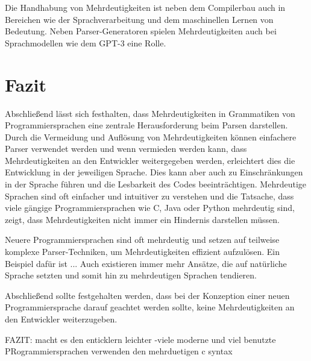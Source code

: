 \documentclass[runningheads]{llncs}
\begin{document}
	Die Handhabung von Mehrdeutigkeiten ist neben dem Compilerbau
	auch in Bereichen wie der Sprachverarbeitung und dem maschinellen Lernen von Bedeutung.
	Neben Parser-Generatoren spielen Mehrdeutigkeiten auch bei Sprachmodellen wie dem GPT-3 eine Rolle.


	\section{Fazit}\label{sec:zusammenfassung}

	Abschließend lässt sich festhalten, dass Mehrdeutigkeiten in Grammatiken von Programmiersprachen
	eine zentrale Herausforderung beim Parsen darstellen.
	Durch die Vermeidung und Auflösung von Mehrdeutigkeiten können einfachere Parser verwendet werden
	und wenn vermieden werden kann, dass Mehrdeutigkeiten an den Entwickler weitergegeben werden,
	erleichtert dies die Entwicklung in der jeweiligen Sprache.
	Dies kann aber auch zu Einschränkungen in der Sprache führen und die Lesbarkeit des Codes beeinträchtigen.
	Mehrdeutige Sprachen sind oft einfacher und intuitiver zu verstehen
	und die Tatsache, dass viele gängige Programmiersprachen wie C, Java oder Python mehrdeutig sind,
	zeigt, dass Mehrdeutigkeiten nicht immer ein Hindernis darstellen müssen.

	Neuere Programmiersprachen sind oft mehrdeutig und setzen auf teilweise komplexe Parser-Techniken,
	um Mehrdeutigkeiten effizient aufzulösen.
	Ein Beispiel dafür ist ...
	Auch existieren immer mehr Ansätze, die auf natürliche Sprache setzten
	und somit hin zu mehrdeutigen Sprachen tendieren.

	Abschließend sollte festgehalten werden, dass bei der Konzeption einer neuen Programmiersprache
	darauf geachtet werden sollte, keine Mehrdeutigkeiten an den Entwickler weiterzugeben.

	FAZIT: macht es den enticklern leichter
	-viele moderne und viel benutzte PRogrammiersprachen verwenden den mehrduetigen c syntax


%
%
%


	\nocite{*}
	
	
\end{document}
